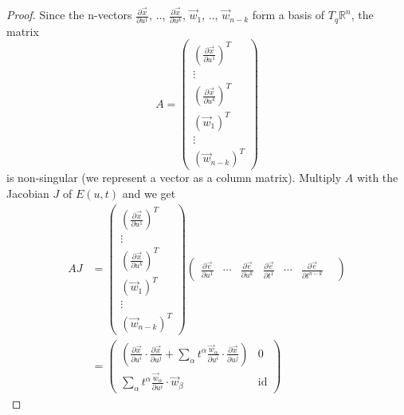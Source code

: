\documentclass[a4paper,11pt,reqno]{amsart}
\DeclareMathOperator{\id}{id}
\newcommand{\RR}{\mathbb{R}}      %
\newcommand{\vect}[1]{\vec{#1}}
\begin{document}
\begin{proof}
  Since the n-vectors $\frac{\partial \vect{x}}{\partial u^1}$, ..,
  $\frac{\partial \vect{x}}{\partial u^k}$, $\vect{w}_1$, .., $\vect{w}_{n-k}$
  form a basis of $T_q\RR^n$, the matrix
  \begin{equation}
    A = \left(
      \begin{matrix}
        \left(\frac{\partial \vect{x}}{\partial u^1}\right)^T \\
        \vdots \\
        \left(\frac{\partial \vect{x}}{\partial u^k}\right)^T \\
        \left(\vect{w}_1\right)^T \\
        \vdots \\
        \left(\vect{w}_{n-k}\right)^T
      \end{matrix}
    \right)
  \end{equation}
  is non-singular (we represent a vector as a column matrix). Multiply $A$ with
  the Jacobian $J$ of $E(u, t)$ and we get
  \begin{equation}
    \begin{aligned}
      AJ &= 
      \left(
        \begin{matrix}
          \left(\frac{\partial \vect{x}}{\partial u^1}\right)^T \\
          \vdots \\
          \left(\frac{\partial \vect{x}}{\partial u^k}\right)^T \\
          \left(\vect{w}_1\right)^T \\
            \vdots \\
          \left(\vect{w}_{n-k}\right)^T
        \end{matrix}
      \right)
      \left(
        \begin{matrix}
          \frac{\partial \vect{e}}{\partial u^1} &
          \cdots &
          \frac{\partial \vect{e}}{\partial u^k} &
          \frac{\partial \vect{e}}{\partial t^1} &
          \cdots &
          \frac{\partial \vect{e}}{\partial t^{n-k}} &
        \end{matrix}
      \right) \\
      &=
      \left(
        \begin{matrix}
          \left( \frac{\partial \vect{x}}{\partial u^i} \cdot \frac{\partial
              \vec{x}}{\partial u^j} + \sum_{\alpha}
            t^{\alpha}\frac{\vec{w}_{\alpha}}{\partial u^i} \cdot \frac{\partial
              \vect{x}}{\partial u^j} \right) & 0
          \\
          \sum_{\alpha} t^{\alpha}\frac{\vect{w}_{\alpha}}{\partial u^i} \cdot
          \vect{w}_{\beta} & \id
        \end{matrix}
      \right)
    \end{aligned}
  \end{equation}
  

\end{proof}
\end{document}
